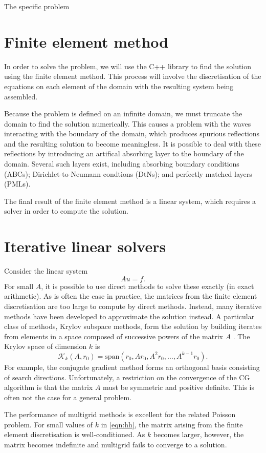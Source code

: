 The specific problem 


\section{Finite element method}

In order to solve the problem, we will use the C++ library \oomph to find the solution using the finite element method.
This process will involve the discretisation of the equations on each element of the domain with the resulting system being assembled.

Because the problem is defined on an infinite domain, we must truncate the domain to find the solution numerically.
This causes a problem with the waves interacting with the boundary of the domain, which produces spurious reflections and the resulting solution to become meaningless.
It is possible to deal with these reflections by introducing an artifical absorbing layer to the boundary of the domain.
Several such layers exist, including absorbing boundary conditions (ABCs); Dirichlet-to-Neumann condtions (DtNs); and perfectly matched layers (PMLs).

The final result of the finite element method is a linear system, which requires a solver in order to compute the solution.

\section{Iterative linear solvers}

Consider the linear system
\[
	A u = f.
\]
For small $A$, it is possible to use direct methods to solve these exactly (in exact arithmetic).
As is often the case in practice, the matrices from the finite element discretisation are too large to compute by direct methods.
Instead, many iterative methods have been developed to approximate the solution instead.
A particular class of methods, Krylov subspace methods, form the solution by building iterates from elements in a space composed of successive powers of the matrix $A$ \cite{leveque}.
The Krylov space of dimension $k$ is 
\[
	\mathcal{K}_k(A, r_0) = \mathrm{span}(r_0, Ar_0, A^2 r_0, \ldots, A^{k-1} r_0).
\]
For example, the conjugate gradient method forms an orthogonal basis consisting of search directions.
Unfortunately, a restriction on the convergence of the CG algorithm is that the matrix $A$ must be symmetric and positive definite.
This is often not the case for a general problem.

The performance of multigrid methods is excellent for the related Poisson problem.
For small values of $k$ in \eqref{eqn:hh}, the matrix arising from the finite element discretisation is well-conditioned.
As $k$ becomes larger, however, the matrix becomes indefinite and multigrid fails to converge to a solution.


